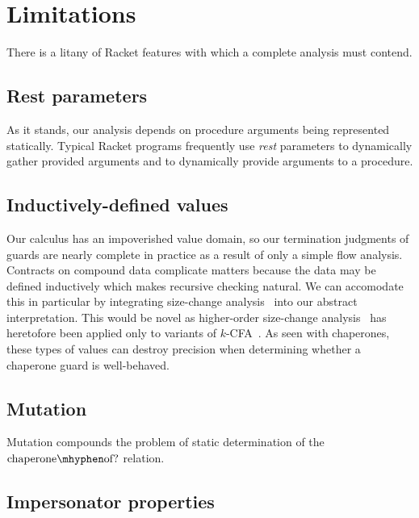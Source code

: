 \section{Limitations}
\label{sec:limitations}

There is a litany of Racket features with which a complete analysis must contend.

\subsection{Rest parameters}

As it stands, our analysis depends on procedure arguments being represented statically.
Typical Racket programs frequently use \emph{rest} parameters to dynamically gather provided arguments and  to dynamically provide arguments to a procedure.

\subsection{Inductively-defined values}

Our calculus has an impoverished value domain, so our termination judgments of guards are nearly complete in practice as a result of only a simple flow analysis.
Contracts on compound data complicate matters because the data may be defined inductively which makes recursive checking natural.
We can accomodate this in particular by integrating size-change analysis~\cite{lee2001size} into our abstract interpretation.
This would be novel as higher-order size-change analysis~\cite{sereni2007termination} has heretofore been applied only to variants of $k$-CFA~\cite{shivers1991control}.
As seen with chaperones, these types of values can destroy precision when determining whether a chaperone guard is well-behaved.

\subsection{Mutation}

Mutation compounds the problem of static determination of the $\mathrm{chaperone\mhyphen of?}$ relation.

\subsection{Impersonator properties}


